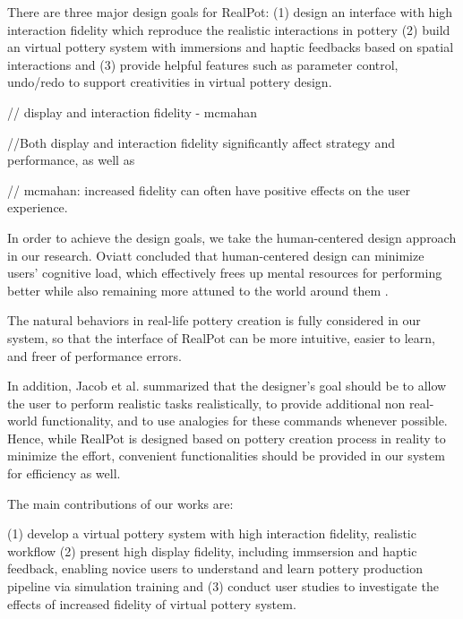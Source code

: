 \documentclass{svjour3}                     %
\begin{document}
There are three major design goals for RealPot:
(1) design an interface with high interaction fidelity which reproduce the realistic interactions in pottery
(2) build an virtual pottery system with immersions and haptic feedbacks based on spatial interactions 
and (3) provide helpful features such as parameter control, undo/redo to support creativities in virtual pottery design.

// display and interaction fidelity - mcmahan

//Both display and interaction fidelity significantly affect strategy and performance, as well as 

// mcmahan: increased fidelity can often have positive effects on the user experience.

In order to achieve the design goals, we take the human-centered design approach in our research.
Oviatt concluded that human-centered design can minimize users’ cognitive load, which effectively frees up mental resources for performing better while also remaining more attuned to the world around them \cite{oviatt2006human}.


The natural behaviors in real-life pottery creation is fully considered in our system, so that the interface of RealPot can be more intuitive, easier to learn, and freer of performance errors.

In addition, Jacob et al. \cite{Jacob2008Reality} summarized that the designer's goal should be to allow the user to perform realistic tasks realistically, to provide additional non real-world functionality, and to use analogies for these commands whenever possible.
Hence, while RealPot is designed based on pottery creation process in reality to minimize the effort, convenient functionalities should be provided in our system for efficiency as well.





The main contributions of our works are:

(1) develop a virtual pottery system with high interaction fidelity, realistic workflow
(2) present high display fidelity, including immsersion and haptic feedback, enabling novice users to understand and learn pottery production pipeline via simulation training 
and (3) conduct user studies to investigate the effects of increased fidelity of virtual pottery system.
\end{document}
